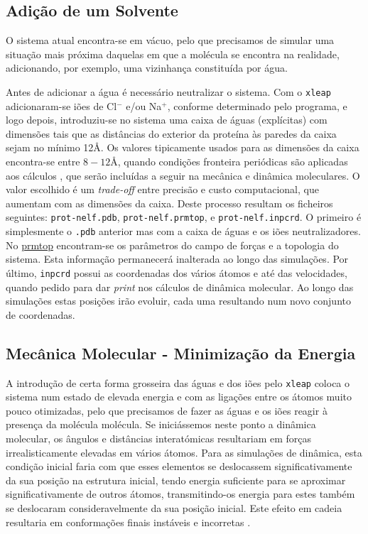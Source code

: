\documentclass[12pt,a4paper]{article}
\begin{document}
\subsection{Adição de um Solvente}
	O sistema atual encontra-se em vácuo, pelo que precisamos de simular uma situação mais próxima daquelas em que a molécula se encontra na realidade, adicionando, por exemplo, uma vizinhança constituída por água.
	
	Antes de adicionar a água é necessário neutralizar o sistema. Com o \verb|xleap| adicionaram-se iões de Cl$^-$ e/ou Na$^+$, conforme determinado pelo programa, e logo depois, introduziu-se no sistema uma caixa de águas (explícitas) com dimensões tais que as distâncias do exterior da proteína às paredes da caixa sejam no mínimo 12\AA. Os valores tipicamente usados para as dimensões da caixa encontra-se entre $8-12$\AA, quando condições fronteira periódicas são aplicadas aos cálculos \cite{galindo-murilloMolecularModelingNucleic2014}, que serão incluídas a seguir na mecânica e dinâmica moleculares. O valor escolhido é um \textit{trade-off} entre precisão e custo computacional, que aumentam com as dimensões da caixa. Deste processo resultam os ficheiros seguintes: \verb|prot-nelf.pdb|, \verb|prot-nelf.prmtop|, e \verb|prot-nelf.inpcrd|. O primeiro é simplesmente o \verb|.pdb| anterior mas com a caixa de águas e os iões neutralizadores. No \href{https://ambermd.org/FileFormats.php#topology}{prmtop} encontram-se os parâmetros do campo de forças e a topologia do sistema. Esta informação permanecerá inalterada ao longo das simulações. Por último, \verb|inpcrd| possui as coordenadas dos vários átomos e até das velocidades, quando pedido para dar \textit{print} nos cálculos de dinâmica molecular. Ao longo das simulações estas posições irão evoluir, cada uma resultando num novo conjunto de coordenadas.	
		
\subsection{Mecânica Molecular - Minimização da Energia}
	A introdução de certa forma grosseira das águas e dos iões pelo \verb|xleap| coloca o sistema num estado de elevada energia e com as ligações entre os átomos muito pouco otimizadas, pelo que precisamos de fazer as águas e os iões reagir à presença da molécula molécula. Se iniciássemos neste ponto a dinâmica molecular, os ângulos e distâncias interatómicas resultariam em forças irrealisticamente elevadas em vários átomos. Para as simulações de dinâmica, esta condição inicial faria com que esses elementos se deslocassem significativamente da sua posição na estrutura inicial, tendo energia suficiente para se aproximar significativamente de outros átomos, transmitindo-os energia para estes também se deslocaram consideravelmente da sua posição inicial. Este efeito em cadeia resultaria em conformações finais instáveis e incorretas \cite{cheathamMolecularModelingNucleic2001}.
	
\end{document}
